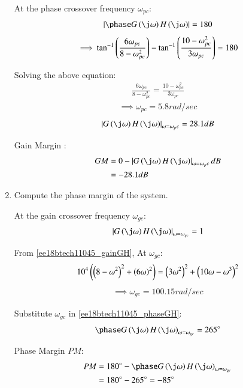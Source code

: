 \begin{enumerate}[label=\thesubsection.\arabic*.,ref=\thesubsection.\theenumi]
At the phase crossover frequency $\omega_{pc}$:
\begin{align}
    \abs{\phase G\brak{\j\omega}H\brak{\j\omega}} = 180
\end{align}
\begin{align}
    \implies \tan^{-1}\left(\frac{6\omega_{pc}}{8 - \omega_{pc}^2}\right) - \tan^{-1}\left(\frac{10-\omega_{pc}^2}{3\omega_{pc}}\right) = 180
\end{align}

Solving the above equation:
\begin{align}
    \frac{6\omega_{pc}}{8 - \omega_{pc}^2} = \frac{10-\omega_{pc}^2}{3\omega_{pc}}
\end{align}
\begin{align}
    \implies \omega_{pc} = 5.8 rad/sec
\end{align}
\begin{align}
    \abs{G\brak{\j\omega}H\brak{\j\omega}}_{\omega=\omega_pc} = 28.1 dB
\end{align}

Gain Margin  :
\begin{align}
    GM &= 0 - \abs{G\brak{\j\omega}H\brak{\j\omega}}_{\omega=\omega_pc} dB
    \\&= -28.1 dB
\end{align}


\item Compute the phase margin of the system.

\solution

At the gain crossover frequency $\omega_{gc}$:
\begin{align}
    \abs{G\brak{\j\omega}H\brak{\j\omega}}_{\omega=\omega_{gc}} = 1
\end{align}

From \eqref{ee18btech11045_gainGH}, At $\omega_{gc}$:
\begin{align}
    10^4\left(\left(8-\omega^2\right)^2 + \left(6\omega\right)^2\right)=
    \left(3\omega^2\right)^2 + \left(10\omega - \omega^3\right)^2
\end{align}
\begin{align}
    \implies \omega_{gc} = 100.15 rad/sec
\end{align}

Substitute $\omega_{gc}$ in \eqref{ee18btech11045_phaseGH}:
\begin{align}
    \phase G\brak{\j\omega}H\brak{\j\omega}_{\omega = \omega_{gc}} = 265\degree
\end{align}

Phase Margin {$PM$}:
\begin{align}
    PM &= 180\degree - \phase G\brak{\j\omega}H\brak{\j\omega}_{\omega = \omega_{gc}}
    \\
    &= 180\degree - 265\degree = - 85\degree
\end{align}



\end{enumerate}
